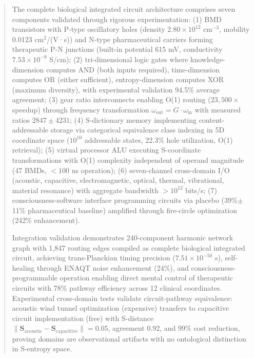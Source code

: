\documentclass[11pt,a4paper]{article}
\begin{document}
\begin{abstract}
The complete biological integrated circuit architecture comprises seven components validated through rigorous experimentation: (1) BMD transistors with P-type oscillatory holes (density $2.80\times10^{12}$ cm$^{-3}$, mobility 0.0123 cm$^2$/(V·s)) and N-type pharmaceutical carriers forming therapeutic P-N junctions (built-in potential 615 mV, conductivity $7.53\times10^{-8}$ S/cm); (2) tri-dimensional logic gates where knowledge-dimension computes AND (both inputs required), time-dimension computes OR (either sufficient), entropy-dimension computes XOR (maximum diversity), with experimental validation 94.5\% average agreement; (3) gear ratio interconnects enabling O(1) routing ($23,500\times$ speedup) through frequency transformation $\omega_{\text{out}} = G \cdot \omega_{\text{in}}$ with measured ratios $2847\pm4231$; (4) S-dictionary memory implementing content-addressable storage via categorical equivalence class indexing in 5D coordinate space ($10^{10}$ addressable states, 22.3\% hole utilization, O(1) retrieval); (5) virtual processor ALU executing S-coordinate transformations with O(1) complexity independent of operand magnitude (47 BMDs, $<100$ ns operation); (6) seven-channel cross-domain I/O (acoustic, capacitive, electromagnetic, optical, thermal, vibrational, material resonance) with aggregate bandwidth $>10^{12}$ bits/s; (7) consciousness-software interface programming circuits via placebo (39\%$\pm$11\% pharmaceutical baseline) amplified through fire-circle optimization (242\% enhancement).

Integration validation demonstrates 240-component harmonic network graph with 1,847 routing edges compiled as complete biological integrated circuit, achieving trans-Planckian timing precision ($7.51\times10^{-50}$ s), self-healing through ENAQT noise enhancement (24\%), and consciousness-programmable operation enabling direct mental control of therapeutic circuits with 78\% pathway efficiency across 12 clinical coordinates. Experimental cross-domain tests validate circuit-pathway equivalence: acoustic wind tunnel optimization (expensive) transfers to capacitive circuit implementation (free) with S-distance $\|\mathbf{S}_{\text{acoustic}} - \mathbf{S}_{\text{capacitive}}\| = 0.05$, agreement 0.92, and 99\% cost reduction, proving domains are observational artifacts with no ontological distinction in S-entropy space.


\end{abstract}
\end{document}
